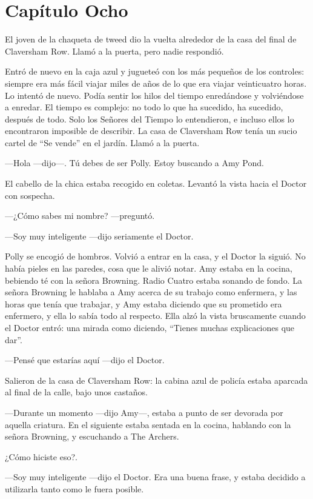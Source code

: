 \chapter*{Capítulo Ocho} 

El joven de la chaqueta de tweed dio la vuelta alrededor de la casa del final de Claversham Row. Llamó a la puerta, pero nadie respondió.

Entró de nuevo en la caja azul y jugueteó con los más pequeños de los controles: siempre era más fácil viajar miles de años de lo que era viajar veinticuatro horas. Lo intentó de nuevo. Podía sentir los hilos del tiempo enredándose y volviéndose a enredar. El tiempo es complejo: no todo lo que ha sucedido, ha sucedido, después de todo. Solo los Señores del Tiempo lo entendieron, e incluso ellos lo encontraron imposible de describir. La casa de Claversham Row tenía un sucio cartel de ``Se vende'' en el jardín. Llamó a la puerta.

---Hola ---dijo---. Tú debes de ser Polly. Estoy buscando a Amy Pond.

El cabello de la chica estaba recogido en coletas. Levantó la vista hacia el Doctor con sospecha.

---¿Cómo sabes mi nombre? ---preguntó.

---Soy muy inteligente ---dijo seriamente el Doctor.

Polly se encogió de hombros. Volvió a entrar en la casa, y el Doctor la siguió. No había pieles en las paredes, cosa que le alivió notar. Amy estaba en la cocina, bebiendo té con la señora Browning. Radio Cuatro estaba sonando de fondo. La señora Browning le hablaba a Amy acerca de su trabajo como enfermera, y las horas que tenía que trabajar, y Amy estaba diciendo que su prometido era enfermero, y ella lo sabía todo al respecto. Ella alzó la vista bruscamente cuando el Doctor entró: una mirada como diciendo, ``Tienes muchas explicaciones que dar''.

---Pensé que estarías aquí ---dijo el Doctor.

Salieron de la casa de Claversham Row: la cabina azul de policía estaba aparcada al final de la calle, bajo unos castaños.

---Durante un momento ---dijo Amy---, estaba a punto de ser devorada por aquella criatura. En el siguiente estaba sentada en la cocina, hablando con la señora Browning, y escuchando a The Archers.

¿Cómo hiciste eso?.

---Soy muy inteligente ---dijo el Doctor. Era una buena frase, y estaba decidido a utilizarla tanto como le fuera posible.

